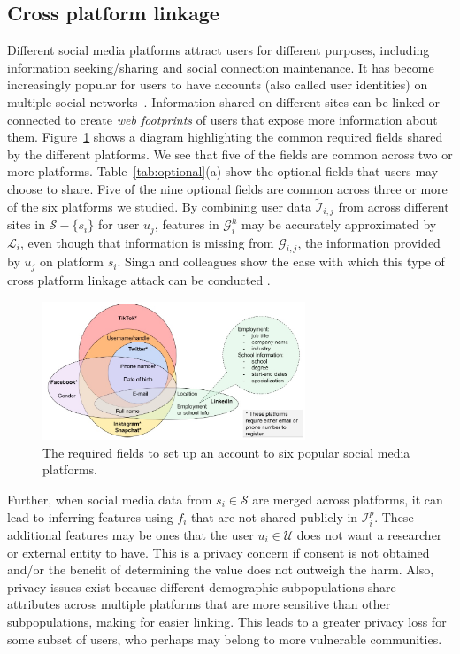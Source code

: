 \documentclass[11pt]{article} %
\begin{document}
\subsection{Cross platform linkage}
Different social media platforms attract users for different purposes, including information seeking/sharing and social connection maintenance. It has become increasingly popular for users to have accounts (also called user identities) on multiple social networks~\cite{10.1145/3068777.3068781}. Information shared on different sites can be linked or connected to create \textit{web footprints} of users that expose more information about them. 
Figure~\ref{fig:req_fields} shows a diagram highlighting the common required fields shared by the different platforms. We see that five of the fields are common across two or more platforms. Table~\ref{tab:optional}(a) show the optional fields that users may choose to share. 
Five of the nine optional fields are common across three or more of the six platforms we studied. 
By combining user data $\widetilde{\mathcal{I}}_{i,j}$ from across different sites in $\mathcal{S} - \{s_i\}$ for user $u_j$, features in $\mathcal{G}^h_i$ may be accurately approximated by $\mathcal{L}_i$, even though that information is missing from $\mathcal{G}_{i,j}$, the information provided by $u_j$ on platform $s_i$. Singh and colleagues show the ease with which this type of cross platform linkage attack can be conducted \cite{singh2015}. 


\begin{figure}[tb]
    \centering
        \includegraphics[width=0.7\textwidth]{figs/req_fields1.png}
    \caption{The required fields to set up an account to six popular social media platforms.}
    \label{fig:req_fields}
\end{figure}

Further, when social media data from $s_i \in \mathcal{S}$ are merged across platforms, it can lead to inferring features using $f_i$ that are not shared publicly in ${\mathcal{I}^p_i}$. These additional features may be ones that the user $u_i \in \mathcal{U}$ does not want a researcher or external entity to have. This is a privacy concern if consent is not obtained and/or the benefit of determining the value does not outweigh the harm. Also, privacy issues exist because different demographic subpopulations share attributes across multiple platforms that are more sensitive than other subpopulations, making for easier linking. This leads to a greater privacy loss for some subset of users, who perhaps may belong to more vulnerable communities.
\end{document}

